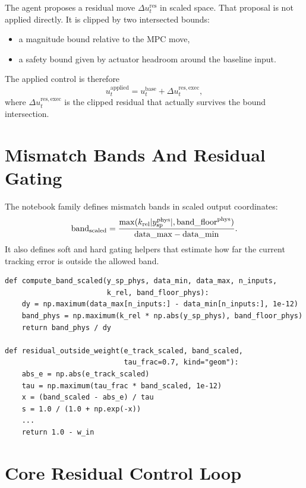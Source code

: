\documentclass[11pt]{article}
\begin{document}
The agent proposes a residual move $\Delta u_t^{\mathrm{res}}$ in scaled space.
That proposal is not applied directly. It is clipped by two intersected bounds:

\begin{itemize}
\item a magnitude bound relative to the MPC move,
\item a safety bound given by actuator headroom around the baseline input.
\end{itemize}

The applied control is therefore
\[
u_t^{\mathrm{applied}} = u_t^{\mathrm{base}} + \Delta u_t^{\mathrm{res,exec}},
\]
where $\Delta u_t^{\mathrm{res,exec}}$ is the clipped residual that actually
survives the bound intersection.

\section*{Mismatch Bands And Residual Gating}

The notebook family defines mismatch bands in scaled output coordinates:
\[
\mathrm{band}_{\mathrm{scaled}} =
\frac{\max(k_{\mathrm{rel}} |y_{\mathrm{sp}}^{\mathrm{phys}}|,
\mathrm{band\_floor}^{\mathrm{phys}})}
{\mathrm{data\_max} - \mathrm{data\_min}}.
\]
It also defines soft and hard gating helpers that estimate how far the current
tracking error is outside the allowed band.

\begin{lstlisting}
def compute_band_scaled(y_sp_phys, data_min, data_max, n_inputs,
                        k_rel, band_floor_phys):
    dy = np.maximum(data_max[n_inputs:] - data_min[n_inputs:], 1e-12)
    band_phys = np.maximum(k_rel * np.abs(y_sp_phys), band_floor_phys)
    return band_phys / dy

def residual_outside_weight(e_track_scaled, band_scaled,
                            tau_frac=0.7, kind="geom"):
    abs_e = np.abs(e_track_scaled)
    tau = np.maximum(tau_frac * band_scaled, 1e-12)
    x = (band_scaled - abs_e) / tau
    s = 1.0 / (1.0 + np.exp(-x))
    ...
    return 1.0 - w_in
\end{lstlisting}

\section*{Core Residual Control Loop}
\end{document}
